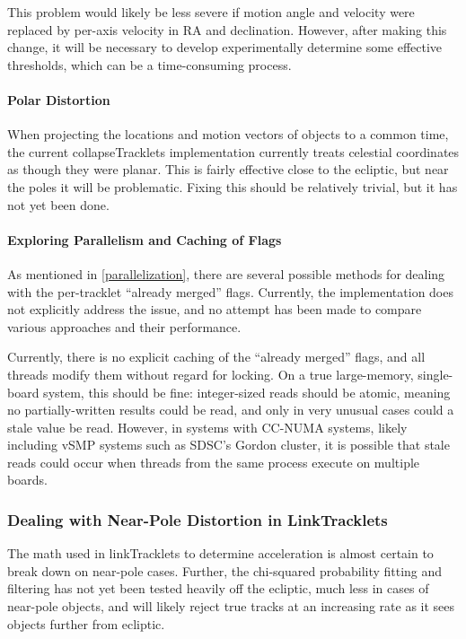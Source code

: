 This problem would likely be less severe if motion angle and velocity
were replaced by per-axis velocity in RA and declination.  However,
after making this change, it will be necessary to develop
experimentally determine some effective thresholds, which can be a
time-consuming process.

\paragraph{Polar Distortion}
When projecting the locations and motion vectors of objects to a
common time, the current collapseTracklets implementation currently
treats celestial coordinates as though they were planar.  This is
fairly effective close to the ecliptic, but near the poles it will be
problematic.  Fixing this should be relatively trivial, but it has not
yet been done.

\paragraph{Exploring Parallelism and Caching of Flags}
As mentioned in \ref{parallelization}, there are several possible
methods for dealing with the per-tracklet ``already merged'' flags.
Currently, the implementation does not explicitly address the issue,
and no attempt has been made to compare various approaches and their
performance.

Currently, there is no explicit caching of the ``already merged''
flags, and all threads modify them without regard for locking.  On a
true large-memory, single-board system, this should be fine:
integer-sized reads should be atomic, meaning no partially-written
results could be read, and only in very unusual cases could a stale
value be read. However, in systems with CC-NUMA systems, likely
including vSMP systems such as SDSC's Gordon cluster, it is possible
that stale reads could occur when threads from the same process
execute on multiple boards.


\subsubsection{Dealing with Near-Pole Distortion in LinkTracklets}

The math used in linkTracklets to determine acceleration is almost
certain to break down on near-pole cases.  Further, the chi-squared
probability fitting and filtering has not yet been tested heavily off
the ecliptic, much less in cases of near-pole objects, and will likely
reject true tracks at an increasing rate as it sees objects further
from ecliptic.

